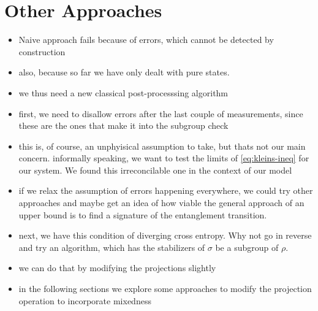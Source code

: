\section{Other Approaches}\label{sec:other-approaches}
\begin{itemize}
  \item Naive approach fails because of errors, which cannot be detected by
    construction
  \item also, because so far we have only dealt with pure states.
  \item we thus need a new classical post-processsing algorithm
  \item first, we need to disallow errors after the last couple of
    measurements, since these are the ones that make it into the subgroup check
  \item this is, of course, an unphyisical assumption to take, but thats not
    our main concern. informally speaking, we want to test the limits of
    \cref{eq:kleins-ineq} for our system. We found this irreconcilable one in
    the context of our model
  \item if we relax the assumption of errors happening everywhere, we could try
    other approaches and maybe get an idea of how viable the general approach
    of an upper bound is to find a signature of the entanglement transition.
  \item next, we have this condition of diverging cross entropy. Why not go in
    reverse and try an algorithm, which has the stabilizers of $\sigma$ be a
    subgroup of $\rho$.
  \item we can do that by modifying the projections slightly
  \item in the following sections we explore some approaches to modify the
    projection operation to incorporate mixedness
\end{itemize}
